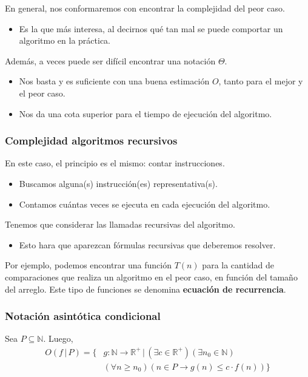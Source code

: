 \begin{multicols}{2}
    En general, nos conformaremos con encontrar la complejidad del peor caso.
    \begin{itemize}
        \item Es la que más interesa, al decirnos qué tan mal se puede comportar un algoritmo en la práctica.
    \end{itemize}
    
    Además, a veces puede ser difícil encontrar una notación $\Theta$.
    \begin{itemize}
        \item Nos basta y es suficiente con una buena estimación $O$, tanto para el mejor y el peor caso.
        \item Nos da una cota superior para el tiempo de ejecución del algoritmo.
    \end{itemize}
    
    \subsubsection*{Complejidad algoritmos recursivos}
    En este caso, el principio es el mismo: contar instrucciones.
    \begin{itemize}
        \item Buscamos alguna(s) instrucción(es) representativa(s).
        \item Contamos cuántas veces se ejecuta en cada ejecución del algoritmo.
    \end{itemize}
    
    Tenemos que considerar las llamadas recursivas del algoritmo.
    \begin{itemize}
        \item Esto hara que aparezcan fórmulas recursivas que deberemos resolver.
    \end{itemize}
    
    Por ejemplo, podemos encontrar una función $T(n)$ para la cantidad de comparaciones que realiza un algoritmo en el peor caso, en función del tamaño del arreglo. Este tipo de funciones se denomina \textbf{ecuación de recurrencia}.
    
    
    \subsubsection*{Notación asintótica condicional}
    Sea $P \subseteq \mathbb{N}$. Luego,
    \begin{align*}
        O(f \,|\, P) = \{ &g: \mathbb{N} \rightarrow \mathbb{R}^+ \,|\, (\exists c \in \mathbb{R}^+)(\exists n_0 \in \mathbb{N})\\
        &(\forall n \geq n_0) (n \in P \rightarrow g(n) \leq c \cdot f(n))\}
    \end{align*}
    

\end{multicols}
